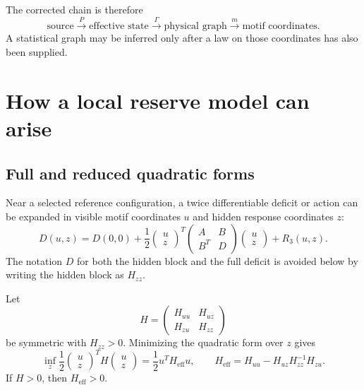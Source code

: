 \documentclass[11pt]{article}
\begin{document}
The corrected chain is therefore
\[
  \text{source}
  \xrightarrow{P}
  \text{effective state}
  \xrightarrow{\Gamma}
  \text{physical graph}
  \xrightarrow{m}
  \text{motif coordinates}.
\]
A statistical graph may be inferred only after a law on those coordinates
has also been supplied.

\section{How a local reserve model can arise}

\subsection{Full and reduced quadratic forms}

Near a selected reference configuration, a twice differentiable deficit or
action can be expanded in visible motif coordinates $u$ and hidden response
coordinates $z$:
\[
  D(u,z)
  =
  D(0,0)
  +\frac12
  \begin{pmatrix}u\\ z\end{pmatrix}^{\!T}
  \begin{pmatrix}A&B\\ B^T&D\end{pmatrix}
  \begin{pmatrix}u\\ z\end{pmatrix}
  +R_3(u,z).
\]
The notation $D$ for both the hidden block and the full deficit is avoided
below by writing the hidden block as $H_{zz}$.

\begin{theorem}
Let
\[
  H=
  \begin{pmatrix}H_{uu}&H_{uz}\\H_{zu}&H_{zz}\end{pmatrix}
\]
be symmetric with $H_{zz}>0$.  Minimizing the quadratic form over $z$ gives
\[
  \inf_z\frac12
  \begin{pmatrix}u\\z\end{pmatrix}^{\!T}
  H
  \begin{pmatrix}u\\z\end{pmatrix}
  =
  \frac12u^TH_{\mathrm{eff}}u,
\qquad
  H_{\mathrm{eff}}
  =
  H_{uu}-H_{uz}H_{zz}^{-1}H_{zu}.
\]
If $H>0$, then $H_{\mathrm{eff}}>0$.
\end{theorem}
\end{document}
